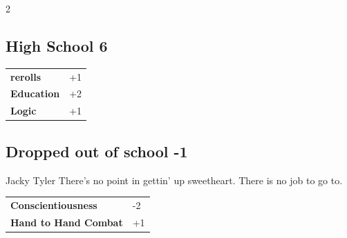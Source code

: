 \begin{multicols}{2}
\begin{tcolorbox}

\end{tcolorbox}

\begin{tcolorbox}
    \subsection*{High School \hfill \small{6 }}
    \tcblower




\begin{tabular}{@{}ll@{}}
    \textbf{rerolls} & +1\\
    \textbf{Education} & +2\\
    \textbf{Logic} & +1\\
\end{tabular}


\end{tcolorbox}

\begin{tcolorbox}
    \subsection*{Dropped out of school \hfill \small{-1 }}
    \tcblower


\begin{pquote}{Jacky Tyler}
There's no point in gettin' up sweetheart. There is no job to go to.
\end{pquote}

\vspace{3mm}

\begin{tabular}{@{}ll@{}}
    \textbf{Conscientiousness} & -2\\
    \textbf{Hand to Hand Combat} & +1\\
\end{tabular}


\end{tcolorbox}
\end{multicols}
